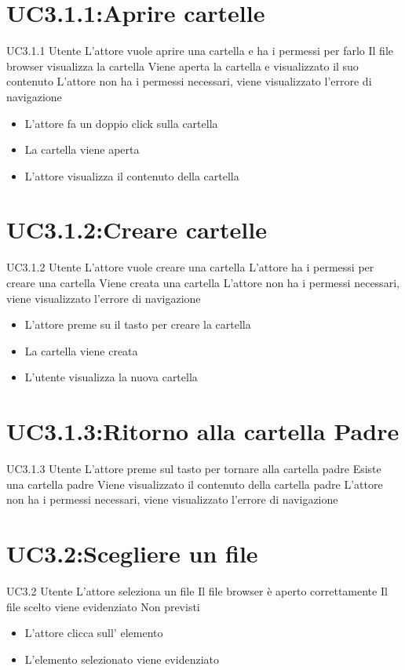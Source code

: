 \documentclass[../AnalisideiRequisiti.tex]{subfiles}
\begin{document}
	\section{UC3.1.1:Aprire cartelle}
	\UserCase
	{UC3.1.1}
	{Utente}
	{}
	{L'attore vuole aprire una cartella e ha i permessi per farlo}
	{Il file browser visualizza la cartella}
	{Viene aperta la cartella e visualizzato il suo contenuto}
	{L'attore non ha i permessi necessari, viene visualizzato l'errore di navigazione }
	{
		\begin{itemize}
			\item{} L'attore fa un doppio click sulla cartella
			\item{} La cartella viene aperta
			\item{} L'attore visualizza il contenuto della cartella
		\end{itemize}
	}
	\section{UC3.1.2:Creare cartelle}
	\UserCase
	{UC3.1.2}
	{Utente}
	{}
	{L'attore vuole creare una cartella}
	{L'attore ha i permessi per creare una cartella}
	{Viene creata una cartella}
	{L'attore non ha i permessi necessari, viene visualizzato l'errore di navigazione }
	{
		\begin{itemize}
		\item{} L'attore preme su il tasto per creare la cartella
		\item{} La cartella viene creata
		\item{} L'utente visualizza la nuova cartella
		\end{itemize}
	}

	\section{UC3.1.3:Ritorno alla cartella Padre}
\UserCase
{UC3.1.3}
{Utente}
{}
{L'attore preme sul tasto per tornare alla cartella padre}
{Esiste una cartella padre}
{Viene visualizzato il contenuto della cartella padre}
{L'attore non ha i permessi necessari, viene visualizzato l'errore di navigazione }
{}
	\section{UC3.2:Scegliere un file}
\UserCase
{UC3.2}
{Utente}
{}
{L'attore seleziona un file}
{Il file browser è aperto correttamente}
{Il file scelto viene evidenziato}
{Non previsti}
{
	\begin{itemize}
		\item{} L'attore clicca sull' elemento
		\item{} L'elemento selezionato viene evidenziato
	\end{itemize}
}
\end{document}
